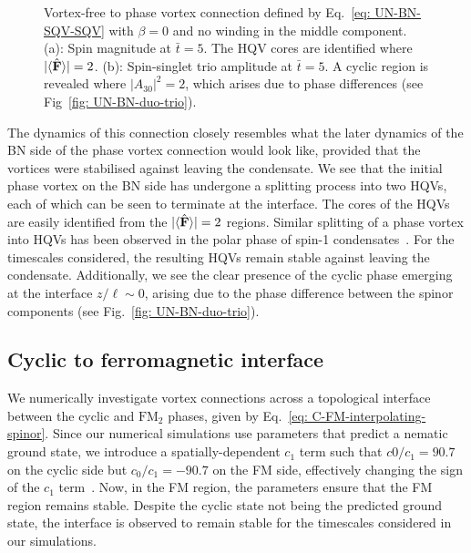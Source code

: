 \begin{figure}
\begin{subfigure}{0.45\textwidth}
        \caption{}
    \end{subfigure}
    \caption[Dynamics of a singly quantised vortex to vortex-free connection in
    a uniaxial nematic to biaxial nematic interface]
    {\label{fig: UN-BN-VF-SQV} Vortex-free to phase vortex connection defined
    by Eq.~\eqref{eq: UN-BN-SQV-SQV} with \(\beta=0\) and no winding in the
    middle component.
    (a): Spin magnitude at \(\bar{t}=5\). The HQV cores are identified where
    \(|\langle \hat{\vb{F}} \rangle | = 2\).
    (b): Spin-singlet trio amplitude at \(\bar{t} = 5\). A cyclic region is
    revealed where \(|A_{30}|^2 = 2\), which arises due to phase differences
    (see Fig~\ref{fig: UN-BN-duo-trio}).}
\end{figure}
The dynamics of this connection closely resembles what the later dynamics of the
BN side of the phase vortex connection would look like, provided that the
vortices were stabilised against leaving the condensate.
We see that the initial phase vortex on the BN side has undergone a splitting
process into two HQVs, each of which can be seen to terminate at the interface.
The cores of the HQVs are easily identified from the
\(|\langle \hat{\vb{F}} \rangle | = 2\) regions.
Similar splitting of a phase vortex into HQVs has been observed in the polar
phase of spin-1 condensates~\cite{Seo2015, Xiao2021}.
For the timescales considered, the resulting HQVs remain stable against
leaving the condensate.
Additionally, we see the clear presence of the cyclic phase emerging at the
interface \(z / \ell \sim 0\), arising due to the phase difference between
the spinor components (see Fig.~\ref{fig: UN-BN-duo-trio}).

\subsection{Cyclic to ferromagnetic interface}
We numerically investigate vortex connections across a topological interface
between the cyclic and \(\text{FM}_2\) phases, given by
Eq.~\eqref{eq: C-FM-interpolating-spinor}.
Since our numerical simulations use parameters that predict a nematic ground
state, we introduce a spatially-dependent \(c_1\) term such that \(c0/c_1=90.7\)
on the cyclic side but \(c_0/c_1=-90.7\) on the FM side, effectively changing
the sign of the \(c_1\) term~\cite{Fatemi2000,Papoular2010}.
Now, in the FM region, the parameters ensure that the FM region remains stable.
Despite the cyclic state not being the predicted ground state, the interface
is observed to remain stable for the timescales considered in our simulations.

